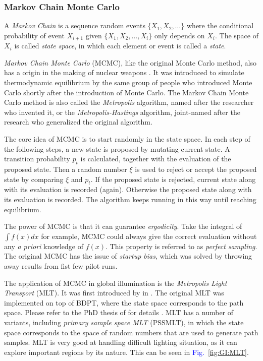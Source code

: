 \documentclass[]{book}
\renewcommand{\figurename}{\textcolor{blue}{Fig.\ }}
\begin{document}
\subsubsection*{Markov Chain Monte Carlo}
A \textit{Markov Chain} is a sequence random events $\{X_1, X_2, \dots \}$ where the conditional probability of event $X_{i+1}$ given $\{X_1, X_2, \dots, X_i\}$ only depends on $X_i$.
The space of $X_i$ is called \textit{state space}, in which each element or event is called a \textit{state}.

\textit{Markov Chain Monte Carlo} (MCMC), like the original Monte Carlo method, also has a origin in the making of nuclear weapons \cite{MCMChandbook}.
It was introduced to simulate thermodynamic equilibrium by the same group of people who introduced Monte Carlo shortly after the introduction of Monte Carlo.
The Markov Chain Monte Carlo method is also called the \textit{Metropolis} algorithm, named after the researcher who invented it, or the \textit{Metropolis-Hastings} algorithm, joint-named after the research who generalized the original algorithm.

The core idea of MCMC is to start randomly in the state space.
In each step of the following steps, a new state is proposed by mutating current state.
A transition probability $p_t$ is calculated, together with the evaluation of the proposed state.
Then a random number $\xi$ is used to reject or accept the proposed state by comparing $\xi$ and $p_t$.
If the proposed state is rejected, current state along with its evaluation is recorded (again).
Otherwise the proposed state along with its evaluation is recorded.
The algorithm keeps running in this way until reaching equilibrium.

The power of MCMC is that it can guarantee \textit{ergodicity}.
Take the integral of $\int f(x) dx$ for example, MCMC could always give the correct evaluation without any \textit{a priori} knowledge of $f(x)$.
This property is referred to as \textit{perfect sampling}.
The original MCMC has the issue of \textit{startup bias}, which was solved by throwing away results from fist few pilot runs. 

The application of MCMC in global illumination is the \textit{Metropolis Light Transport} (MLT).
It was first introduced by \citeauthor{veach1997MLT} in \citeyear{veach1997MLT} \cite{veach1997MLT}.
The original MLT was implemented on top of BDPT, where the state space corresponds to the path space.
Please refer to the PhD thesis of \citeauthor{veach1997robust} for details \cite{veach1997robust}.
MLT has a number of variants, including \textit{primary sample space MLT} (PSSMLT), in which the state space corresponds to the space of random numbers that are used to generate path samples.
MLT is very good at handling difficult lighting situation, as it can explore important regions by its nature.
This can be seen in \figurename \ref{fig:GI:MLT}.
\end{document}
